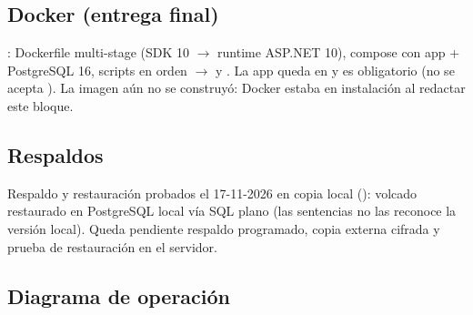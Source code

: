 \subsection{Docker (entrega final)}

: Dockerfile multi-stage (SDK 10 $\rightarrow$
runtime ASP.NET 10), compose con app + PostgreSQL 16, scripts
 en orden  $\rightarrow$  y
. La app queda en  y
 es obligatorio (no se acepta \codigo{*}). La imagen
aún no se construyó: Docker estaba en instalación al redactar este bloque.

\subsection{Respaldos}

Respaldo y restauración probados el 17-11-2026 en copia local
(): volcado  restaurado en
PostgreSQL local vía SQL plano (las sentencias  no las
reconoce la versión local). Queda pendiente respaldo programado, copia
externa cifrada y prueba de restauración en el servidor.

\clearpage
\subsection{Diagrama de operación}


\clearpage
